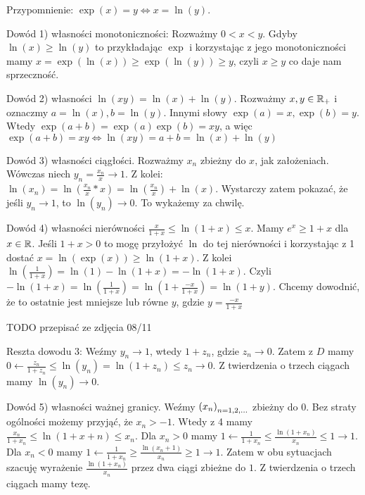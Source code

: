 \documentclass[9pt]{article}
\begin{document}
Przypomnienie: $\exp(x) = y \iff x = \ln(y)$. 

\bigbreak

Dowód 1) własności monotoniczności: Rozważmy $0 < x <y$. Gdyby $\ln(x) \ge \ln(y)$ to przykładając
$\exp$ i korzystając z jego monotoniczności mamy $x = \exp(\ln(x)) \ge \exp(\ln(y)) \ge y$, czyli $x
\ge y$ co daje nam sprzeczność.

\bigbreak

Dowód 2) własności $\ln(xy) = \ln(x) + \ln(y)$. Rozważmy $x, y \in \mathbb{R}_+$ i oznaczmy $a = \ln(x), b =
\ln(y)$. Innymi słowy $\exp(a) = x, \exp(b) = y$. Wtedy $\exp(a+b) = \exp(a)\exp(b) = xy$, a więc
$\exp(a+b) = xy \iff \ln(xy) = a+b = \ln(x) + \ln(y)$

\bigbreak

Dowód 3) własności ciągłości. Rozważmy $x_n$ zbieżny do $x$, jak założeniach. Wówczas niech $y_n =
\frac{x_n}{x} \to 1$. Z kolei: $\ln(x_n) = \ln\left(\frac{x_n}{x} * x\right) =
\ln\left(\frac{x_n}{x}\right) + \ln(x)$. Wystarczy zatem pokazać, że jeśli $y_n \to 1$, to $\ln(y_n)
\to 0$. To wykażemy za chwilę.

\bigbreak

Dowód 4) własności nierówności $\frac{x}{1+x} \le \ln(1+x) \le x$. Mamy $e^x \ge 1+x$ dla $x \in
\mathbb{R}$. Jeśli $1+x > 0$ to mogę przyłożyć $\ln$ do tej nierówności i korzystając z 1 dostać $x =
\ln(\exp(x)) \ge \ln(1+x)$. Z kolei $\ln(\frac{1}{1+x}) = \ln(1) - \ln(1+x) = -\ln(1+x)$. Czyli
$-\ln(1+x) = \ln(\frac{1}{1+x}) = \ln(1 + \frac{-x}{1+x}) = \ln(1+y)$. Chcemy dowodnić, że to
ostatnie jest mniejsze lub równe $y$, gdzie $y = \frac{-x}{1+x}$

TODO przepisać ze zdjęcia 08/11

\bigbreak

Reszta dowodu 3: Weźmy $y_n \to 1$, wtedy $1 + z_n$, gdzie $z_n \to 0$. Zatem z $D$ mamy
$0 \leftarrow \frac{z_n}{1+z_n} \le \ln(y_n) = \ln (1+z_n) \le z_n \to 0$. Z twierdzenia o trzech
ciągach mamy $\ln(y_n) \to 0$.

\bigbreak

Dowód 5) własności ważnej granicy. Weźmy $\left(x_n\right)_{n = 1,2,...}$ zbieżny do $0$. Bez straty ogólności możemy
przyjąć, że $x_n > -1$. Wtedy z 4 mamy $\frac{x_n}{1+x_n} \le \ln(1+x+n) \le x_n$. Dla $x_n > 0$
mamy $1 \leftarrow \frac{1}{1+x_n} \le \frac{\ln(1+x_n)}{x_n} \le 1 \to 1$. Dla $x_n < 0$ mamy $1
\leftarrow \frac{1}{1+x_n} \ge \frac{\ln(x_n + 1)}{x_n} \ge 1 \to 1$. Zatem w obu sytuacjach szacuję
wyrażenie $\frac{\ln(1+x_n)}{x_n}$ przez dwa ciągi zbieżne do $1$. Z twierdzenia o trzech ciągach
mamy tezę.
\end{document}
